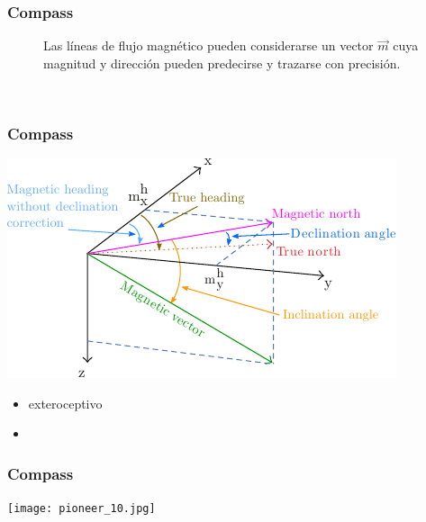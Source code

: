 \begin{frame}
    \frametitle{Compass}   
    \begin{figure}[!h]
        
        Las líneas de flujo magnético pueden considerarse un vector $\vec{m}$ cuya magnitud y dirección pueden predecirse y trazarse con precisión.
        
        \centering
        \\
    \end{figure}

\end{frame}


\begin{frame}
    \frametitle{Compass}

    \begin{center}
        \includegraphics[width=0.5\columnwidth]{images/magnetic_field.pdf}
    \end{center}

    \begin{itemize}
        \item exteroceptivo
        \item
    \end{itemize}
\end{frame}

\begin{frame}
    \frametitle{Compass}

    \begin{center}
        \texttt{[image: pioneer\_10.jpg]}
    \end{center}
\end{frame}